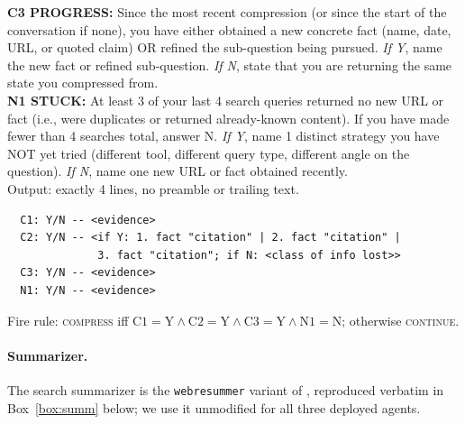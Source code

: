 \documentclass{article}
\begin{document}
\begin{tcolorbox}
  \textbf{C3 PROGRESS:} Since the most recent compression (or since the start of the conversation if none), you have either obtained a new concrete fact (name, date, URL, or
   quoted claim) OR refined the sub-question being pursued.
    \emph{If Y}, name the new fact or refined sub-question.
    \emph{If N}, state that you are returning the same state you compressed from.\\

  \textbf{N1 STUCK:} At least 3 of your last 4 search queries returned no new URL or fact (i.e., were duplicates or returned already-known content). If you have made fewer
  than 4 searches total, answer N.
    \emph{If Y}, name 1 distinct strategy you have NOT yet tried (different tool, different query type, different angle on the question).
    \emph{If N}, name one new URL or fact obtained recently. \\

  \smallskip
  Output: exactly 4 lines, no preamble or trailing text.
  \begin{verbatim}
  C1: Y/N -- <evidence>
  C2: Y/N -- <if Y: 1. fact "citation" | 2. fact "citation" |
              3. fact "citation"; if N: <class of info lost>>
  C3: Y/N -- <evidence>
  N1: Y/N -- <evidence>
  \end{verbatim}

  Fire rule: \textsc{compress} iff $\text{C1}=\text{Y} \land \text{C2}=\text{Y} \land \text{C3}=\text{Y} \land \text{N1}=\text{N}$; otherwise \textsc{continue}.
  \end{tcolorbox}

\paragraph{Summarizer.} The search summarizer is the
\texttt{webresummer} variant of
\citet{wu2026resumunlockinglonghorizonsearch}, reproduced verbatim in
Box~\ref{box:summ} below; we use it unmodified for all three deployed agents.
\end{document}
